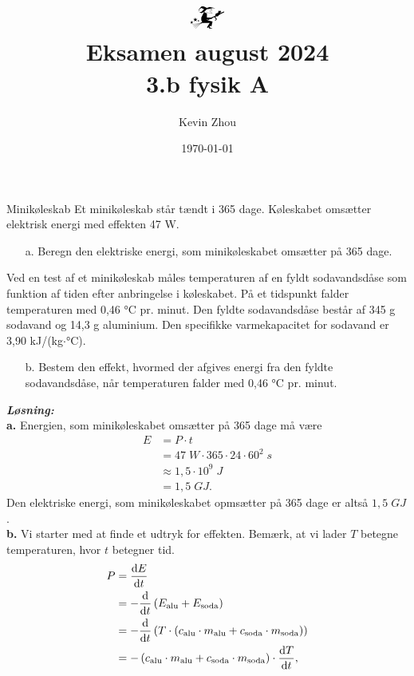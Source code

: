 \documentclass{report}
\title{
\[
\mathwitch*
\]
Eksamen august 2024\\
{\Large \textbf{3.b fysik A}}}
\author{Kevin Zhou}
\date{\today}
\newcommand{\sol}{\setlength{\parindent}{0cm}\textbf{\textit{Løsning:}}\setlength{\parindent}{1cm}}
\begin{document}
\maketitle
\begin{question}{Minikøleskab}{}
  Et minikøleskab står tændt i 365 dage. Køleskabet omsætter elektrisk energi med effekten 47 W. 
  \begin{itemize}
    \item[a.] Beregn den elektriske energi, som minikøleskabet omsætter på 365 dage.
  \end{itemize}
  Ved en test af et minikøleskab måles temperaturen af en fyldt sodavandsdåse som funktion af tiden efter anbringelse i køleskabet. På et tidspunkt falder temperaturen med 0,46 °C pr. minut. 
  Den fyldte sodavandsdåse består af 345 g sodavand og 14,3 g aluminium. Den specifikke varmekapacitet for sodavand er 3,90 kJ/(kg$\cdot$°C).
\begin{itemize}
  \item[b.] Bestem den effekt, hvormed der afgives energi fra den fyldte sodavandsdåse, når temperaturen falder med 0,46 °C pr. minut.
\end{itemize}
\end{question}
\sol \\
\textbf{a.}
Energien, som minikøleskabet omsætter på 365 dage må være
\begin{equation*}
\begin{split}
  E &= P \cdot t \\
  &=47 \;\unit{W}  \cdot 365 \cdot 24 \cdot 60^2 \;\unit{s} \\
  &\approx 1,5 \cdot 10 ^{9} \;\unit{J} \\
  &=1,5 \;\unit{GJ}.
\end{split}
\end{equation*}
Den elektriske energi, som minikøleskabet opmsætter på 365 dage er altså $1,5 \;\unit{GJ} $. \\[1ex]
\textbf{b.}
Vi starter med at finde et udtryk for effekten.
Bemærk, at vi lader $T$ betegne temperaturen, hvor $t$ betegner tid. 
\begin{equation*}
\begin{split}
  P&=\dv{E}{t}\\
  &=-\dv{t} \left(E _{\text{alu}} + E _{\text{soda}}\right) \\
  &=-\dv{t} \left(T \cdot \left(c _{\text{alu}}\cdot m _{\text{alu}} + c _{\text{soda}} \cdot m _{\text{soda}}\right) \right) \\
  &=-\left(c _{\text{alu}}\cdot m _{\text{alu}} + c _{\text{soda}} \cdot m _{\text{soda}}\right) \cdot \dv{T}{t},
\end{split}
\end{equation*}
\end{document}
